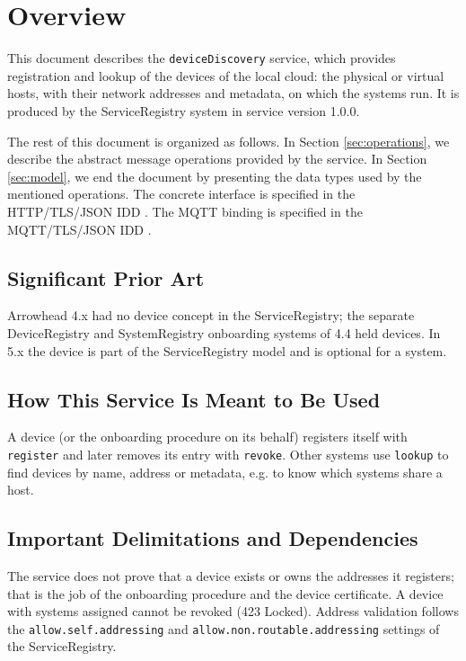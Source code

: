 \documentclass[a4paper]{arrowhead}
\begin{document}
\section{Overview}
\label{sec:overview}

This document describes the \texttt{deviceDiscovery} service, which provides registration and lookup of the devices of the local cloud: the physical or virtual hosts, with their network addresses and metadata, on which the systems run.
It is produced by the ServiceRegistry system \cite{sr-sysd} in service version 1.0.0.

The rest of this document is organized as follows.
In Section \ref{sec:operations}, we describe the abstract message operations provided by the service.
In Section \ref{sec:model}, we end the document by presenting the data types used by the mentioned operations.
The concrete interface is specified in the HTTP/TLS/JSON IDD \cite{sr-deviceDiscovery-http-idd}. The MQTT binding is specified in the MQTT/TLS/JSON IDD \cite{sr-deviceDiscovery-mqtt-idd}.

\subsection{Significant Prior Art}

Arrowhead 4.x had no device concept in the ServiceRegistry; the separate DeviceRegistry and SystemRegistry onboarding systems of 4.4 held devices. In 5.x the device is part of the ServiceRegistry model and is optional for a system.

\subsection{How This Service Is Meant to Be Used}

A device (or the onboarding procedure on its behalf) registers itself with \texttt{register} and later removes its entry with \texttt{revoke}. Other systems use \texttt{lookup} to find devices by name, address or metadata, e.g. to know which systems share a host.

\subsection{Important Delimitations and Dependencies}
\label{sec:delimitations}

The service does not prove that a device exists or owns the addresses it registers; that is the job of the onboarding procedure and the device certificate. A device with systems assigned cannot be revoked (423 Locked). Address validation follows the \texttt{allow.\allowbreak{}self.\allowbreak{}addressing} and \texttt{allow.\allowbreak{}non.\allowbreak{}routable.\allowbreak{}addressing} settings of the ServiceRegistry.
\end{document}
